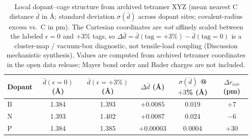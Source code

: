 \begin{table}[!ht]
\caption{\label{tab:V}Local dopant--cage structure from archived tetramer XYZ (mean nearest C distance $\bar{d}$ in \AA; standard deviation $\sigma(\bar{d})$ across dopant sites; covalent-radius excess vs.\ C in pm).
The Cartesian coordinates are \emph{not} affinely scaled between the labeled $\epsilon{=}0$ and $+3$\% tags, so $\Delta\bar{d}=\bar{d}(\mathrm{tag}{=}+3\%)-\bar{d}(\mathrm{tag}{=}0)$ is a cluster-map / vacuum-box diagnostic, not tensile-load coupling (Discussion mechanistic synthesis).
Values are computed from archived tetramer coordinates in the open data release; Mayer bond order and Bader charges are not included.}
\begin{ruledtabular}
\begin{tabular}{lccccc}
Dopant & $\bar{d}(\epsilon{=}0)$ (\AA) & $\bar{d}(\epsilon{=}+3\%)$ (\AA) & $\Delta\bar{d}$ (\AA) & $\sigma(\bar{d})$ @ $+3$\% (\AA) & $\Delta r_{\mathrm{cov}}$ (pm) \\
\hline
B & 1.384 & 1.393 & $+0.0085$ & 0.019 & $+7$ \\
N & 1.393 & 1.402 & $+0.0087$ & 0.024 & $-6$ \\
P & 1.384 & 1.385 & $+0.00003$ & 0.0004 & $+30$ \\
\end{tabular}
\end{ruledtabular}
\end{table}
